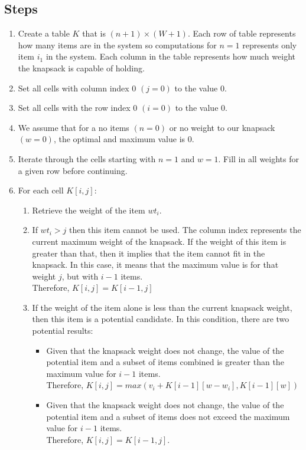 \subsection*{Steps}
\begin{enumerate}
	\item Create a table $K$ that is $(n+1) \times (W+1)$. Each row of table represents how many items are in the system so computations for $n = 1$ represents only item $i_1$ in the system. Each column in the table represents how much weight the knapsack is capable of holding.
	\item Set all cells with column index 0 $(j = 0)$ to the value 0.
	\item Set all cells with the row index 0 $(i = 0)$ to the value 0.
	\item We assume that for a no items $(n = 0)$ or no weight to our knapsack $(w = 0)$, the optimal and maximum value is $0$.
	\item Iterate through the cells starting with $n=1$ and $w = 1$. Fill in all weights for a given row before continuing.
	\item For each cell $K[i,j]$:
	\begin{enumerate}
		\item Retrieve the weight of the item $wt_i$.
		\item If $wt_i > j$ then this item cannot be used. The column index represents the current maximum weight of the knapsack. If the weight of this item is greater than that, then it implies that the item cannot fit in the knapsack. In this case, it means that the maximum value is for that weight $j$, but with $i-1$ items.\\
		Therefore, $K[i,j] = K[i-1,j]$
		\item If the weight of the item alone is less than the current knapsack weight, then this item is a potential candidate. In this condition, there are two potential results:
		\begin{itemize}
			\item Given that the knapsack weight does not change, the value of the potential item and a subset of items combined is greater than the maximum value for $i-1$ items.\\
			Therefore, $K[i,j] = max( v_i + K[i-1][w - w_i], K[i-1][w])$
			\item Given that the knapsack weight does not change, the value of the potential item and a subset of items does not exceed the maximum value for $i-1$ items.\\
			Therefore, $K[i,j] = K[i-1,j]$.

\end{itemize}
\end{enumerate}
\end{enumerate}

